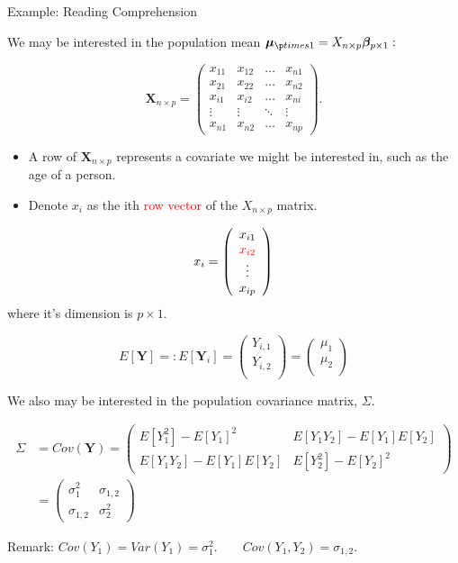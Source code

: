 \documentclass[ignorenonframetext,]{beamer}
\begin{document}
\begin{frame}{Example: Reading Comprehension}

We may be interested in the population mean
\(\bm{\mu}_{\p times 1} = X_{n \times p} \bm{\beta}_{p \times 1}:\)

\[\bm{X}_{n \times p} = 
\left( \begin{array}{cccc}
x_{11} & x_{12} & \ldots&  x_{n1}\\
x_{21} & x_{22} & \ldots& x_{n2} \\
x_{i1} & x_{i2} & \ldots& x_{ni} \\
\vdots & \vdots & \ddots & \vdots \\
x_{n1} & x_{n2} &\ldots& x_{np}
\end{array} \right).
\]

\begin{itemize}
\item
  A row of \(\bm{X}_{n \times p}\) represents a covariate we might be
  interested in, such as the age of a person.
\item
  Denote \(x_i\) as the ith \textcolor{red}{row vector} of the
  \(X_{n \times p}\) matrix.
\end{itemize}

\[  x_{i}= \left( \begin{array}{c}
x_{i1}\\
\textcolor{red}{x_{i2}}\\
\vdots\\
x_{ip}
\end{array} \right) \] where it's dimension is \(p \times 1.\)

\[
E[\bm{Y}] =: E[\bm{Y}_{i}] = \left( \begin{array}{c}
Y_{i,1}\\
Y_{i,2}\\
\end{array} \right) 
=  \left( \begin{array}{c}
\mu_1\\
\mu_2\\
\end{array} \right) 
\]

We also may be interested in the population covariance matrix,
\(\Sigma.\)

\begin{align}
\Sigma &= Cov(\bm{Y})
=
\left( \begin{array}{cccc}
E[Y_1^2] - E[Y_1]^2 & E[Y_1Y_2] - E[Y_1]E[Y_2] \\
E[Y_1Y_2] - E[Y_1]E[Y_2] & E[Y_2^2] - E[Y_2]^2
\end{array} \right)\\
&=
\left( \begin{array}{cccc}
\sigma_1^2 & \sigma_{1,2} \\
\sigma_{1,2} & \sigma_2^2
\end{array} \right)
\end{align}

Remark:
\(Cov(Y_1) = Var(Y_1) = \sigma_1^2. \qquad Cov(Y_1, Y_2) = \sigma_{1,2}.\)

\end{frame}
\end{document}
